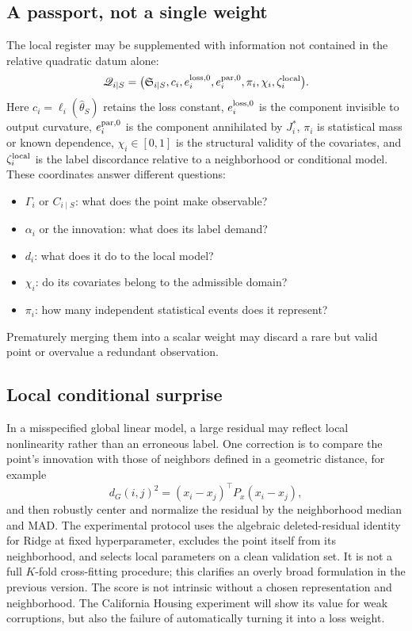 \documentclass[10pt,a4paper]{article}
\newcommand{\Sigreg}{\mathfrak S}
\newcommand{\Qreg}{\mathscr Q}
\begin{document}
\subsection{A passport, not a single weight}
The local register may be supplemented with information not contained in the relative quadratic datum alone:
\begin{equation}
\Qreg_{i\mid S}
=
\bigl(
\Sigreg_{i\mid S},
 c_i,
 e_i^{\rm loss,0},
 e_i^{\rm par,0},
\pi_i,
\chi_i,
\zeta_i^{\rm local}
\bigr).
\end{equation}
Here $c_i=\ell_i(\widehat\theta_S)$ retains the loss constant, $e_i^{\rm loss,0}$ is the component invisible to output curvature, $e_i^{\rm par,0}$ is the component annihilated by $J_i^*$, $\pi_i$ is statistical mass or known dependence, $\chi_i\in[0,1]$ is the structural validity of the covariates, and $\zeta_i^{\rm local}$ is the label discordance relative to a neighborhood or conditional model. These coordinates answer different questions:
\begin{itemize}
  \item $\Gamma_i$ or $C_{i\mid S}$: what does the point make observable?
  \item $\alpha_i$ or the innovation: what does its label demand?
  \item $d_i$: what does it do to the local model?
  \item $\chi_i$: do its covariates belong to the admissible domain?
  \item $\pi_i$: how many independent statistical events does it represent?
\end{itemize}
Prematurely merging them into a scalar weight may discard a rare but valid point or overvalue a redundant observation.

\subsection{Local conditional surprise}
In a misspecified global linear model, a large residual may reflect local nonlinearity rather than an erroneous label. One correction is to compare the point's innovation with those of neighbors defined in a geometric distance, for example
\begin{equation}
d_G(i,j)^2=(x_i-x_j)^\top P_x(x_i-x_j),
\end{equation}
and then robustly center and normalize the residual by the neighborhood median and MAD. The experimental protocol uses the algebraic deleted-residual identity for Ridge at fixed hyperparameter, excludes the point itself from its neighborhood, and selects local parameters on a clean validation set. It is not a full $K$-fold cross-fitting procedure; this clarifies an overly broad formulation in the previous version. The score is not intrinsic without a chosen representation and neighborhood. The California Housing experiment will show its value for weak corruptions, but also the failure of automatically turning it into a loss weight.
\end{document}
